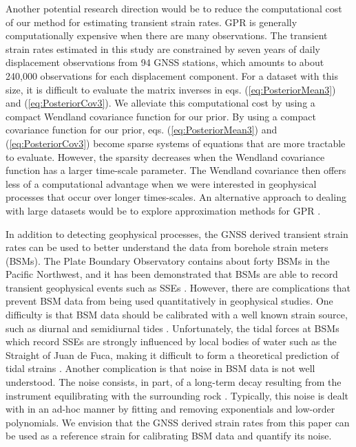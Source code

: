 \documentclass[extra,mreferee]{gji}
\begin{document}



Another potential research direction would be to reduce the
computational cost of our method for estimating transient strain
rates. GPR is generally computationally expensive when there are many
observations. The transient strain rates estimated in this study are
constrained by seven years of daily displacement observations from 94
GNSS stations, which amounts to about 240,000 observations for each
displacement component. For a dataset with this size, it is difficult
to evaluate the matrix inverses in eqs. (\ref{eq:PosteriorMean3}) and
(\ref{eq:PosteriorCov3}). We alleviate this computational cost by
using a compact Wendland covariance function for our prior. By using a
compact covariance function for our prior, eqs.
(\ref{eq:PosteriorMean3}) and (\ref{eq:PosteriorCov3}) become sparse
systems of equations that are more tractable to evaluate. However, the
sparsity decreases when the Wendland covariance function has a larger
time-scale parameter. The Wendland covariance then offers less of a
computational advantage when we were interested in geophysical
processes that occur over longer times-scales. An alternative approach
to dealing with large datasets would be to explore approximation
methods for GPR \citep[sec. 8]{Rasmussen2006}.


In addition to detecting geophysical processes, the GNSS derived
transient strain rates can be used to better understand the data from
borehole strain meters (BSMs). The Plate Boundary Observatory contains
about forty BSMs in the Pacific Northwest, and it has been
demonstrated that BSMs are able to record transient geophysical events
such as SSEs \citep[e.g.,][]{Dragert2011}. However, there are
complications that prevent BSM data from being used quantitatively in
geophysical studies. One difficulty is that BSM data should be
calibrated with a well known strain source, such as diurnal and
semidiurnal tides \citep{Hart1996,Roeloffs2010,Hodgkinson2013}.
Unfortunately, the tidal forces at BSMs which record SSEs are strongly
influenced by local bodies of water such as the Straight of Juan de
Fuca, making it difficult to form a theoretical prediction of tidal
strains \citep{Roeloffs2010}. Another complication is that noise in
BSM data is not well understood. The noise consists, in part, of a
long-term decay resulting from the instrument equilibrating with the
surrounding rock \citep{Gladwin1987}. Typically, this noise is dealt
with in an ad-hoc manner by fitting and removing exponentials and
low-order polynomials. We envision that the GNSS derived strain rates
from this paper can be used as a reference strain for calibrating BSM
data and quantify its noise.
\end{document}
